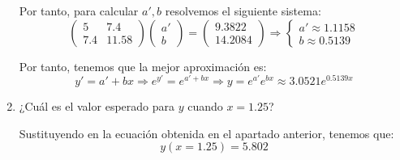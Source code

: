 \begin{ejercicio}
\begin{enumerate}
        Por tanto, para calcular $a',b$ resolvemos el siguiente sistema:
        \begin{equation*}
            \left(\begin{array}{cc}
                5 & 7.4 \\
                7.4 & 11.58
            \end{array}\right)
            \left(\begin{array}{c}
                a' \\ b    
            \end{array}\right)
            = 
            \left(\begin{array}{c}
                9.3822 \\ 14.2084    
            \end{array}\right)
            \Longrightarrow
            \left\{\begin{array}{c}
                a' \approx 1.1158 \\
                b \approx 0.5139
            \end{array}\right.
        \end{equation*}

        Por tanto, tenemos que la mejor aproximación es:
        \begin{equation*}
            y' = a' +bx \Longrightarrow e^{y'} = e^{a'+bx} \Longrightarrow y=e^{a'}e^{bx} \approx 3.0521e^{0.5139x}
        \end{equation*}

        
        \item ¿Cuál es el valor esperado para $y$ cuando $x = 1.25$?

        Sustituyendo en la ecuación obtenida en el apartado anterior, tenemos que:
        \begin{equation*}
            y(x=1.25) = 5.802
        \end{equation*}
    \end{enumerate}
\end{ejercicio}

